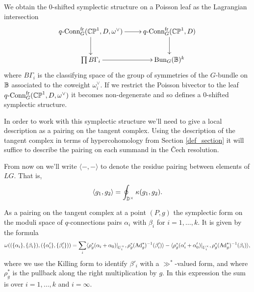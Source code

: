 \documentclass[10pt, oneside]{article}
\newcommand{\qconn}{q\text{-Conn}}
\newcommand{\fr}{\mathrm{fr}}
\newcommand{\Ad}{\mr{Ad}}
\begin{document}
\begin{construction}
We obtain the 0-shifted symplectic structure on a Poisson leaf as the Lagrangian intersection
\[\xymatrix{
\qconn_G^{\fr}(\bb{CP}^1, D, \omega^\vee) \ar[r] \ar[d] &\qconn_G^{\fr}(\bb{CP}^1, D) \ar[d] \\
\prod B\Gamma_i \ar[r] & \bun_G(\bb B)^k
}\]
where $B\Gamma_i$ is the classifying space of the group of symmetries of the $G$-bundle on $\mathbb{B}$ associated to the coweight $\omega^\vee_i$.  If we restrict the Poisson bivector to the leaf $\qconn_G^{\fr}(\bb{CP}^1, D, \omega^\vee)$ it becomes non-degenerate and so defines a 0-shifted symplectic structure.
\end{construction}

In order to work with this symplectic structure we'll need to give a local description as a pairing on the tangent complex.  Using the description of the tangent complex in terms of hypercohomology from Section \ref{def_section} it will suffice to describe the pairing on each summand in the \v Cech resolution.

\begin{remark}
From now on we'll write $\langle - , - \rangle$ to denote the residue pairing between elements of $LG$.  That is, 
\[\langle g_1, g_2 \rangle = \oint_{\mathbb{D}^\times} \kappa(g_1, g_2).\]
\end{remark}

\begin{lemma}
As a pairing on the tangent complex at a point $(P,g)$ the symplectic form on the moduli space of $q$-connections pairs $\alpha_i$ with $\beta_i$ for $i=1,\ldots,k$.  It is given by the formula 
\[\omega((\{\alpha_i\}, \{\beta_i\}), (\{\alpha'_i\},\{\beta_i'\})) = \sum_i \langle \rho_g^*(\alpha_i + \alpha_0)|_{U^\times_i}, \rho_g^*(\Ad_g^*)^{-1}(\beta'_i) \rangle - \langle \rho_g^*(\alpha'_i + \alpha'_0)|_{U^\times_i}, \rho_g^*(\Ad_g^*)^{-1}(\beta_i) \rangle,\]
where we use the Killing form to identify $\beta'_i$ with a $\gg^*$-valued form, and where $\rho_g^*$ is the pullback along the right multiplication by $g$.  In this expression the sum is over $i=1,\ldots,k$ and $i=\infty$.
\end{lemma}
\end{document}
